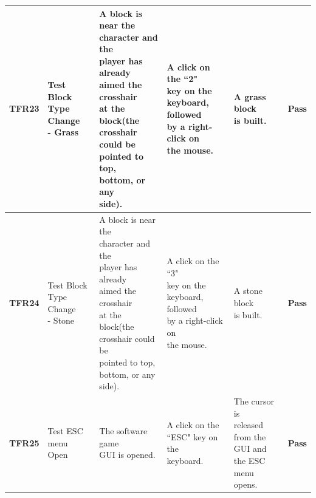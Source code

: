 \documentclass[12pt, titlepage]{article}
\begin{document}
\begin{center}
\begin{longtable}[!bpht]{|m{1.3cm}|m{2.3cm}|m{3.4cm}|m{3.4cm}|m{3.4cm}|m{1cm}|}
\textbf{TFR23} &  \makecell[ml]{Test Block\\ Type Change\\ - Grass} & \makecell[ml]{A block is near the\\ character and the\\ player has already\\ aimed the crosshair\\ at the block(the\\ crosshair could be\\ pointed to top,\\ bottom, or any\\ side).} & \makecell[ml]{A click on the ``2"\\ key on the\\ keyboard, followed\\ by a right-click on\\ the mouse.} & \makecell[ml]{A grass block\\ is built.} & \textbf{Pass}\\\hline

\textbf{TFR24} & \makecell[ml]{Test Block\\ Type Change\\ - Stone} & \makecell[ml]{A block is near the\\ character and the\\ player has already\\ aimed the crosshair\\ at the block(the\\ crosshair could be\\ pointed to top,\\ bottom, or any\\ side).} & \makecell[ml]{A click on the ``3"\\ key on the\\ keyboard, followed\\ by a right-click on\\ the mouse.} & \makecell[ml]{A stone block\\ is built.} & \textbf{Pass}\\\hline

\textbf{TFR25} & \makecell[ml]{Test ESC\\ menu Open} & \makecell[ml]{The software game\\ GUI is opened.} & \makecell[ml]{A click on the\\ ``ESC" key on the\\ keyboard.} & \makecell[ml]{The cursor is\\ released from the\\ GUI and the ESC\\ menu opens.} & \textbf{Pass}\\\hline


\end{longtable}
\end{center}
\end{document}
